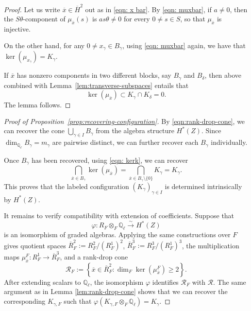 \documentclass[11pt, reqno]{amsart}
\theoremstyle{definition}
\newcommand\QQ{\mathbb{Q}}
\begin{document}
\begin{proof}
Let us write $\overline{x}\in \overline{H}^2$ out as in \eqref{eqn: x bar}.
By \eqref{eqn: muxbar}, if $a\neq 0$, then the $S\theta$-component of $\mu_{\overline{x}}(s)$ is $as\theta\neq 0$ for every $0\neq s\in S$, so that $\mu_{\overline{x}}$ is injective.

On the other hand, for any $0\neq x_{\gamma}\in B_{\gamma}$, using \eqref{eqn: muxbar} again, we have that  $\ker(\mu_{x_\gamma})=K_\gamma$.

If $\overline{x}$ has nonzero components in two different blocks, say $B_\gamma$ and $B_\delta$, then 
above combined with Lemma~\ref{lem:transverse-subspaces} entails that
\[
\ker(\mu_{\overline{x}})
\subset K_\gamma\cap K_\delta=0.
\]
The lemma follows.
\end{proof}

\begin{proof}[Proof of Proposition~\ref{prop:recovering-configuration}]
By \eqref{eqn:rank-drop-cone}, we can recover the cone $\bigcup_{\gamma\in I}B_\gamma$ from the algebra structure $H^*(Z)$.
Since $\dim_{\QQ_\ell}B_\gamma=m_\gamma$ are pairwise distinct, we can further recover each $B_{\gamma}$ individually.

Once $B_\gamma$ has been recovered, using \eqref{eqn: kerk}, we can recover 
\[
\bigcap_{\overline{x}\in B_{\gamma}} \ker(\mu_{\overline{x}})=\bigcap_{\overline{x}\in B_{\gamma}\setminus \{0\}} K_{\gamma}=K_{\gamma}.
\]
This proves that the labeled configuration
$(K_\gamma)_{\gamma\in I}$ is determined intrinsically by $H^*(Z)$.

It remains to verify compatibility with extension of coefficients.
Suppose that
\[
\varphi:R_F\otimes_F\QQ_\ell\xrightarrow{\sim}H^*(Z)
\]
is an isomorphism of graded algebras.  Applying the same constructions
over $F$ gives quotient spaces $\overline R_F^2
:=
R_F^2/(R_F^1)^2$, $\overline R_F^3
:=
R_F^3/(R_F^1)^3$,
 the multiplication maps $\mu^F_{\overline{x}}:
R_F^1\longrightarrow\overline R_F^3$,
and a rank-drop cone
\[
\mathscr R_F
:=
\left\{
\overline{x}\in\overline R_F^2:
\dim_F\ker(\mu^F_{\overline{x}})\geq 2
\right\}.
\]
After extending scalars to $\QQ_\ell$, the isomorphism $\varphi$
identifies $\mathscr R_F$ with $\mathscr R$.
The same argument as in Lemma \ref{lem:rank-drop-cone} shows that we can recover the corresponding $K_{\gamma,F}$ such that $\varphi(K_{\gamma,F}\otimes_F\QQ_\ell)=K_{\gamma}$.
\end{proof}
\end{document}
